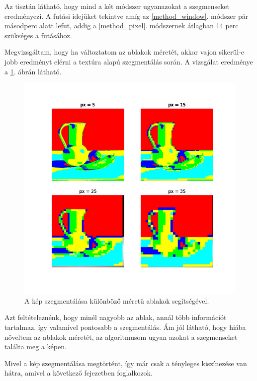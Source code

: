 Az tisztán látható, hogy mind a két módszer ugyanazokat a szegmenseket eredményezi. A futási idejüket tekintve amíg az \ref{method_window}. módszer pár másodperc alatt lefut, addig a \ref{method_pixel}. módszernek átlagban 14 perc szükséges a futásához.

Megvizsgáltam, hogy ha változtatom az ablakok méretét, akkor vajon sikerül-e jobb eredményt elérni a textúra alapú szegmentálás során. A vizsgálat eredménye a \ref{fig:window_different_px}. ábrán látható.

\begin{figure}[h]
\centering
\includegraphics[scale=0.7]{images/window_different_px.png}
\caption{A kép szegmentálása különböző méretű ablakok segítségével.}
\label{fig:window_different_px}
\end{figure}

Azt feltételeznénk, hogy minél nagyobb az ablak, annál több információt tartalmaz, így valamivel pontosabb a szegmentálás. Ám jól látható, hogy hiába növeltem az ablakok méretét, az algoritmusom ugyan azokat a szegmenseket találta meg a képen. 

Mivel a kép szegmentálása megtörtént, így már csak a tényleges kiszínezése van hátra, amivel a következő fejezetben foglalkozok. 